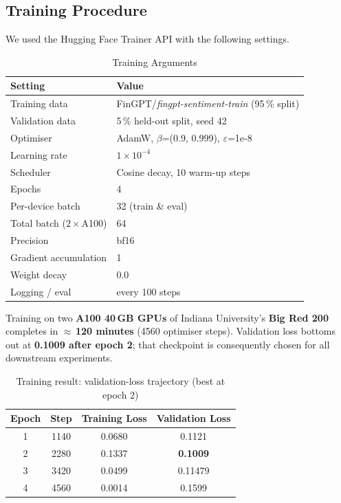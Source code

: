 \documentclass[a4paper]{article}
\begin{document}
\subsection{Training Procedure}

We used the Hugging Face Trainer API with the following settings.

\begin{table}[htbp]
\centering
\caption{Training Arguments}
\label{tab:train-args}
\begin{tabular}{ll}
\toprule
\textbf{Setting} & \textbf{Value} \\
\midrule
Training data        & FinGPT/\textit{fingpt-sentiment-train} (95\,\% split) \\
Validation data      & 5\,\% held-out split, seed 42 \\
Optimiser            & AdamW, $\beta$=(0.9, 0.999), $\varepsilon$=1e-8 \\
Learning rate        & $1 \times 10^{-4}$ \\
Scheduler            & Cosine decay, 10 warm-up steps \\
Epochs               & 4 \\
Per-device batch     & 32 (train \& eval) \\
Total batch ($2\times$A100) & 64 \\
Precision            & bf16 \\
Gradient accumulation & 1 \\
Weight decay         & 0.0 \\
Logging / eval       & every 100 steps \\
\bottomrule
\end{tabular}
\end{table}

Training on two \textbf{A100 40\,GB GPUs} of Indiana University's \textbf{Big Red 200} completes in $\approx$\,\textbf{120 minutes} (4560 optimiser steps). Validation loss bottoms out at \textbf{0.1009 after epoch 2}; that checkpoint is consequently chosen for all downstream experiments.

\begin{table}[htbp]
\centering
\caption{Training result: validation-loss trajectory (best at epoch 2)}
\label{tab:loss-trajectory}
\begin{tabular}{cccc}
\toprule
\textbf{Epoch} & \textbf{Step} & \textbf{Training Loss} & \textbf{Validation Loss} \\
\midrule
1 & 1140 & 0.0680 & 0.1121 \\
2 & 2280 & 0.1337 & \textbf{0.1009} \\
3 & 3420 & 0.0499 & 0.11479 \\
4 & 4560 & 0.0014 & 0.1599 \\
\bottomrule
\end{tabular}
\end{table}
\end{document}
